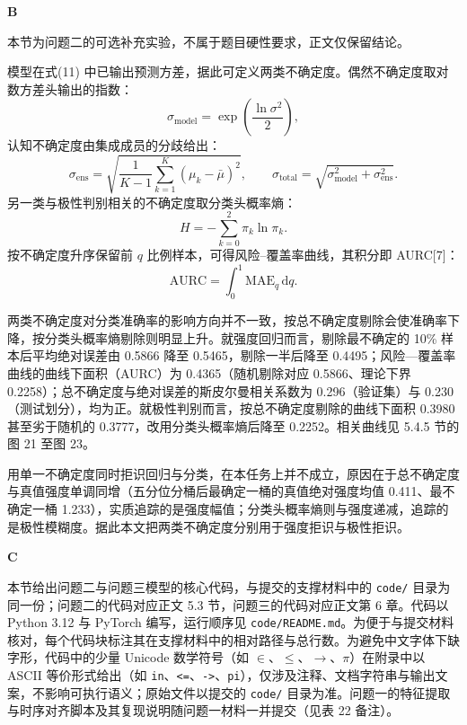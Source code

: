 \documentclass[12pt,a4paper,fontset=windows]{ctexart}
\newcommand{\appxhead}[2]{%
  \par\addvspace{2pt}%
  {\fontsize{15}{18}\selectfont\bfseries #1}\hspace{0.35em}{\heiti\fontsize{15}{18}\selectfont #2}%
  \par\addvspace{9pt}%
}
\begin{document}
\setcounter{page}{57}
\setcounter{equation}{32}

\appxhead{B}{不确定性与拒识能力分析（补充实验）}

本节为问题二的可选补充实验，不属于题目硬性要求，正文仅保留结论。

模型在式(11) 中已输出预测方差，据此可定义两类不确定度。偶然不确定度取对数方差头输出的指数：
\begin{equation}
\sigma_{\mathrm{model}}=\exp\!\left(\frac{\ln\sigma^{2}}{2}\right),
\end{equation}
认知不确定度由集成成员的分歧给出：
\begin{equation}
\sigma_{\mathrm{ens}}=\sqrt{\frac{1}{K-1}\sum_{k=1}^{K}\left(\mu_{k}-\bar{\mu}\right)^{2}},
\qquad
\sigma_{\mathrm{total}}=\sqrt{\sigma_{\mathrm{model}}^{2}+\sigma_{\mathrm{ens}}^{2}}.
\end{equation}
另一类与极性判别相关的不确定度取分类头概率熵：
\begin{equation}
H=-\sum_{k=0}^{2}\pi_{k}\ln\pi_{k}.
\end{equation}
按不确定度升序保留前 $q$ 比例样本，可得风险--覆盖率曲线，其积分即 AURC[7]：
\begin{equation}
\mathrm{AURC}=\int_{0}^{1}\mathrm{MAE}_{q}\,\mathrm{d}q.
\end{equation}

两类不确定度对分类准确率的影响方向并不一致，按总不确定度剔除会使准确率下降，按分类头概率熵剔除则明显上升。就强度回归而言，剔除最不确定的 10\% 样本后平均绝对误差由 0.5866 降至 0.5465，剔除一半后降至 0.4495；风险—覆盖率曲线的曲线下面积（AURC）为 0.4365（随机剔除对应 0.5866、理论下界 0.2258）；总不确定度与绝对误差的斯皮尔曼相关系数为 0.296（验证集）与 0.230（测试划分），均为正。就极性判别而言，按总不确定度剔除的曲线下面积 0.3980 甚至劣于随机的 0.3777，改用分类头概率熵后降至 0.2252。相关曲线见 5.4.5 节的图 21 至图 23。

用单一不确定度同时拒识回归与分类，在本任务上并不成立，原因在于总不确定度与真值强度单调同增（五分位分桶后最确定一桶的真值绝对强度均值 0.411、最不确定一桶 1.233），实质追踪的是强度幅值；分类头概率熵则与强度递减，追踪的是极性模糊度。据此本文把两类不确定度分别用于强度拒识与极性拒识。

\appxhead{C}{核心代码}

本节给出问题二与问题三模型的核心代码，与提交的支撑材料中的 \texttt{code/} 目录为同一份；问题二的代码对应正文 5.3 节，问题三的代码对应正文第 6 章。代码以 Python 3.12 与 PyTorch 编写，运行顺序见 \texttt{code/README.md}。为便于与提交材料核对，每个代码块标注其在支撑材料中的相对路径与总行数。为避免中文字体下缺字形，代码中的少量 Unicode 数学符号（如 $\in$、$\le$、$\to$、$\pi$）在附录中以 ASCII 等价形式给出（如 \texttt{in}、\texttt{<=}、\texttt{->}、\texttt{pi}），仅涉及注释、文档字符串与输出文案，不影响可执行语义；原始文件以提交的 \texttt{code/} 目录为准。问题一的特征提取与时序对齐脚本及其复现说明随问题一材料一并提交（见表 22 备注）。
\end{document}
